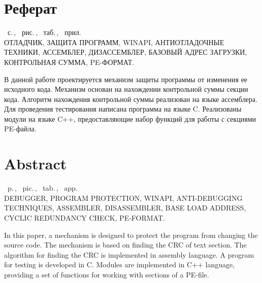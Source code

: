 \chapter*{Реферат}
\thispagestyle{empty}

\begin{center}
  \ztotpages\ с.\,, \totalfigures\ рис.\,, \totaltables\ таб.\,, 
  \totalappendixCounters\ прил.\\
  \vspace{4mm}
  \MakeUppercase{отладчик, защита программ, WinAPI, антиотладочные техники,
  ассемблер, дизассемблер, базовый адрес загрузки, контрольная сумма,
  PE-формат.}
\end{center}

В данной работе проектируется механизм защиты программы от изменения ее
исходного кода. Механизм основан на нахождении контрольной суммы секции кода.
Алгоритм нахождения контрольной суммы реализован на языке ассемблера. Для
проведения тестирования написана программа на языке C. Реализованы модули на
языке C++, предоставляющие набор функций для работы с секциями PE-файла.


\chapter*{Abstract}
\thispagestyle{empty}
\begin{center}
  \ztotpages\ p.\,, \totalfigures\ pic.\,, \totaltables\ tab.\,, 
  \totalappendixCounters\ app.\\
  \vspace{4mm}
  \MakeUppercase{debugger, program protection, WinAPI, anti-debugging techniques,
  assembler, disassembler, base load address, cyclic redundancy check,
  PE-format.}
\end{center}

In this paper, a mechanism is designed to protect the program from changing the
source code. The mechanism is based on finding the CRC of text section. The
algorithm for finding the CRC is implemented in assembly language. A program for
testing is developed in C. Modules are implemented in C++ language, providing a
set of functions for working with sections of a PE-file.
